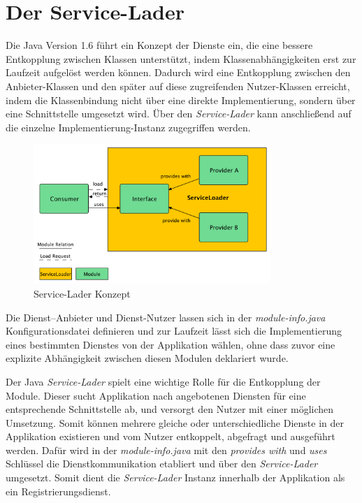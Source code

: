   \section{Der Service-Lader} \label{sec:servLoad} 
    Die Java Version 1.6 führt ein Konzept der Dienste ein, die eine bessere Entkopplung zwischen Klassen unterstützt, indem Klassenabhängigkeiten erst zur Laufzeit aufgelöst werden können. Dadurch wird eine Entkopplung zwischen den Anbieter-Klassen und den später auf diese zugreifenden Nutzer-Klassen erreicht, indem die Klassenbindung nicht über eine direkte Implementierung, sondern über eine Schnittstelle umgesetzt wird. Über den \textit{Service-Lader} kann anschließend auf die einzelne Implementierung-Instanz zugegriffen werden. \bigbreak
    \begin{figure}[h!]
      \centering
      \includegraphics[width=0.8\textwidth]{material/images/ServiceLoadingMulti.pdf}
      \caption{Service-Lader Konzept}
      \label{fig:serviceLoaderMulti}
    \end{figure}
    Die Dienst–Anbieter und Dienst-Nutzer lassen sich in der \textit{module-info.java} Konfigurationsdatei definieren und zur Laufzeit lässt sich die Implementierung eines bestimmten Dienstes von der Applikation wählen, ohne dass zuvor eine explizite Abhängigkeit zwischen diesen Modulen deklariert wurde. \bigbreak

    Der Java \textit{Service-Lader} spielt eine wichtige Rolle für die Entkopplung der Module. Dieser sucht  Applikation nach angebotenen Diensten für eine entsprechende Schnittstelle ab, und versorgt den Nutzer mit einer möglichen Umsetzung. Somit können mehrere gleiche oder unterschiedliche Dienste in der Applikation existieren und vom Nutzer entkoppelt, abgefragt und ausgeführt werden. Dafür wird in der \textit{module-info.java} mit den \textit{provides with} und \textit{uses} Schlüssel die Dienstkommunikation etabliert und über den \textit{Service-Lader} umgesetzt. Somit dient die \textit{Service-Lader} Instanz innerhalb der Applikation als ein Registrierungsdienst.\bigbreak


